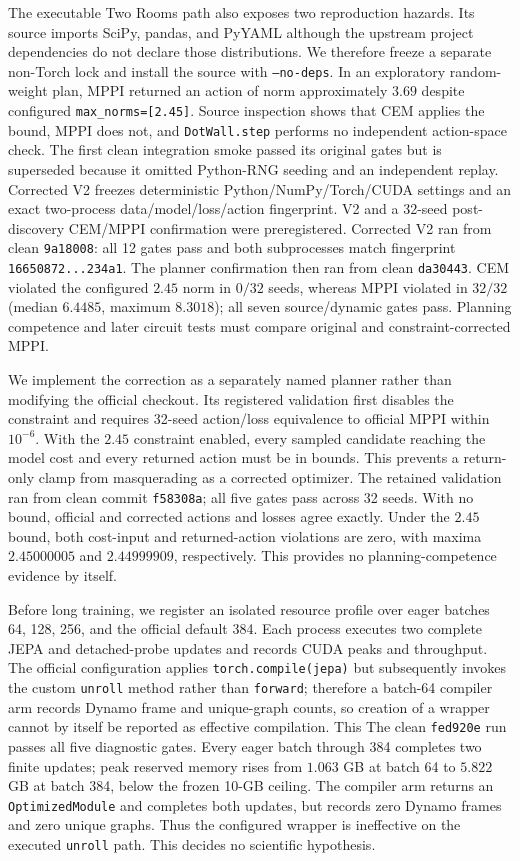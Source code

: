 \documentclass[10pt]{article}
\newcommand{\code}[1]{\texttt{#1}}
\begin{document}
The executable Two Rooms path also exposes two reproduction hazards.  Its
source imports SciPy, pandas, and PyYAML although the upstream project
dependencies do not declare those distributions.  We therefore freeze a
separate non-Torch lock and install the source with \code{--no-deps}.  In an
exploratory random-weight plan, MPPI returned an action of norm approximately
$3.69$ despite configured \code{max\_norms=[2.45]}.  Source inspection shows
that CEM applies the bound, MPPI does not, and \code{DotWall.step} performs no
independent action-space check.  The first clean integration smoke passed its
original gates but is superseded because it omitted Python-RNG seeding and an
independent replay.  Corrected V2 freezes deterministic Python/NumPy/Torch/CUDA
settings and an exact two-process data/model/loss/action fingerprint.  V2 and a
32-seed post-discovery CEM/MPPI confirmation were preregistered.  Corrected V2
ran from clean \code{9a18008}: all 12 gates pass and both subprocesses match
fingerprint \code{16650872...234a1}.  The planner confirmation then ran from
clean \code{da30443}.  CEM violated the configured $2.45$ norm in $0/32$
seeds, whereas MPPI violated in $32/32$ (median $6.4485$, maximum $8.3018$);
all seven source/dynamic gates pass.  Planning competence and later circuit tests
must compare original and constraint-corrected MPPI.

We implement the correction as a separately named planner rather than modifying
the official checkout.  Its registered validation first disables the constraint
and requires 32-seed action/loss equivalence to official MPPI within $10^{-6}$.
With the $2.45$ constraint enabled, every sampled candidate reaching the model
cost and every returned action must be in bounds.  This prevents a return-only
clamp from masquerading as a corrected optimizer.  The retained validation ran
from clean commit \code{f58308a}; all five gates pass across 32 seeds.  With no
bound, official and corrected actions and losses agree exactly.  Under the
$2.45$ bound, both cost-input and returned-action violations are zero, with
maxima $2.45000005$ and $2.44999909$, respectively.  This provides no
planning-competence evidence by itself.

Before long training, we register an isolated resource profile over eager
batches 64, 128, 256, and the official default 384.  Each process executes two
complete JEPA and detached-probe updates and records CUDA peaks and throughput.
The official configuration applies \code{torch.compile(jepa)} but subsequently
invokes the custom \code{unroll} method rather than \code{forward}; therefore a
batch-64 compiler arm records Dynamo frame and unique-graph counts, so creation
of a wrapper cannot by itself be reported as effective compilation.  This
The clean \code{fed920e} run passes all five diagnostic gates.  Every eager
batch through 384 completes two finite updates; peak reserved memory rises from
$1.063$ GB at batch 64 to $5.822$ GB at batch 384, below the frozen 10-GB
ceiling.  The compiler arm returns an \code{OptimizedModule} and completes both
updates, but records zero Dynamo frames and zero unique graphs.  Thus the
configured wrapper is ineffective on the executed \code{unroll} path.  This
decides no scientific hypothesis.
\end{document}
